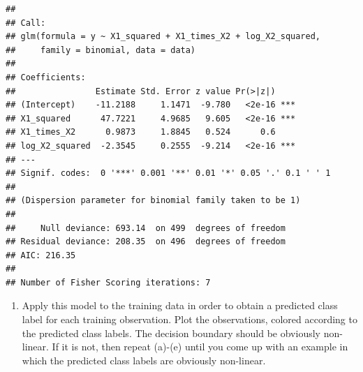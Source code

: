 \documentclass[
]{article}
\newenvironment{Shaded}{\begin{snugshade}}{\end{snugshade}}
\newcommand{\AttributeTok}[1]{\textcolor[rgb]{0.13,0.29,0.53}{#1}}
\newcommand{\DecValTok}[1]{\textcolor[rgb]{0.00,0.00,0.81}{#1}}
\newcommand{\FloatTok}[1]{\textcolor[rgb]{0.00,0.00,0.81}{#1}}
\newcommand{\FunctionTok}[1]{\textcolor[rgb]{0.13,0.29,0.53}{\textbf{#1}}}
\newcommand{\NormalTok}[1]{#1}
\newcommand{\OtherTok}[1]{\textcolor[rgb]{0.56,0.35,0.01}{#1}}
\newcommand{\SpecialCharTok}[1]{\textcolor[rgb]{0.81,0.36,0.00}{\textbf{#1}}}
\newcommand{\StringTok}[1]{\textcolor[rgb]{0.31,0.60,0.02}{#1}}
\providecommand{\tightlist}{%
  \setlength{\itemsep}{0pt}\setlength{\parskip}{0pt}}
\begin{document}
\begin{Shaded}
\end{Shaded}

\begin{verbatim}
## 
## Call:
## glm(formula = y ~ X1_squared + X1_times_X2 + log_X2_squared, 
##     family = binomial, data = data)
## 
## Coefficients:
##                Estimate Std. Error z value Pr(>|z|)    
## (Intercept)    -11.2188     1.1471  -9.780   <2e-16 ***
## X1_squared      47.7221     4.9685   9.605   <2e-16 ***
## X1_times_X2      0.9873     1.8845   0.524      0.6    
## log_X2_squared  -2.3545     0.2555  -9.214   <2e-16 ***
## ---
## Signif. codes:  0 '***' 0.001 '**' 0.01 '*' 0.05 '.' 0.1 ' ' 1
## 
## (Dispersion parameter for binomial family taken to be 1)
## 
##     Null deviance: 693.14  on 499  degrees of freedom
## Residual deviance: 208.35  on 496  degrees of freedom
## AIC: 216.35
## 
## Number of Fisher Scoring iterations: 7
\end{verbatim}

\begin{enumerate}
\def\labelenumi{(\alph{enumi})}
\setcounter{enumi}{5}
\tightlist
\item
  Apply this model to the training data in order to obtain a predicted
  class label for each training observation. Plot the observations,
  colored according to the predicted class labels. The decision boundary
  should be obviously non-linear. If it is not, then repeat (a)-(e)
  until you come up with an example in which the predicted class labels
  are obviously non-linear.
\end{enumerate}
\end{document}
